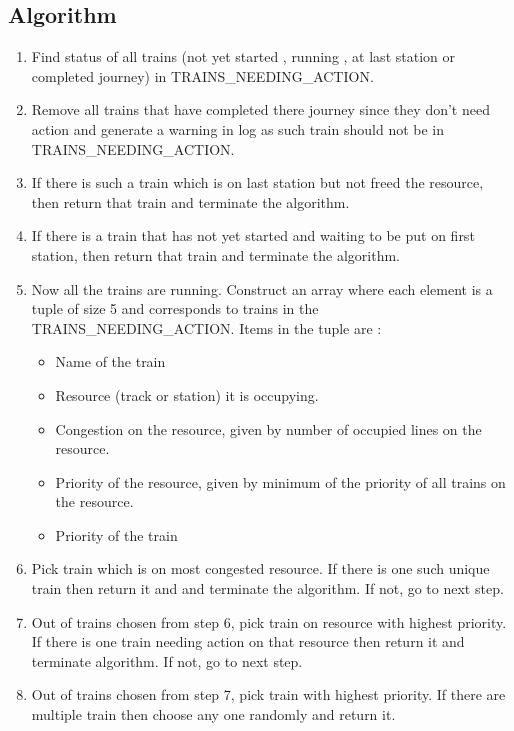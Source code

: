 \subsection{Algorithm}
\begin{enumerate}

\item Find status of all trains (not yet started , running , at last station or completed journey) in  
    TRAINS\_NEEDING\_ACTION.
\item Remove all trains that have completed there journey since they don't need action and generate a warning in log 
    as such train should not be in TRAINS\_NEEDING\_ACTION.
\item If there is such a train which is on last station but not freed the resource, then return that train 
     and terminate the algorithm.
\item If there is a train that has not yet started and waiting to be put on first station, then 
     return that train and terminate the algorithm.
\item Now all the trains are running. Construct an array where each element is a tuple of size 5 and corresponds to trains in 
    the TRAINS\_NEEDING\_ACTION. Items in the tuple are : 
\begin{itemize}
\item Name of the train
\item Resource (track or station) it is occupying.
\item Congestion on the resource, given by number of occupied lines on the resource.
\item Priority of the resource, given by minimum of the priority of all trains on the resource. 
\item Priority of the train
\end{itemize}

\item Pick train which is on most congested resource. If there is one such unique train then return it and 
     and terminate the algorithm. If not, go to next step.
\item Out of trains chosen from step 6, pick train on resource with highest priority. If there is one train needing action on that resource 
     then return it and terminate algorithm. If not, go to next step.
\item Out of trains chosen from step 7, pick train with highest priority. If there are multiple train then choose any one randomly and return it. 
\end{enumerate}